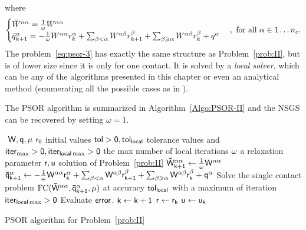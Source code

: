 where
\begin{equation}
  \label{eq:psor-2}
  \begin{cases}
    \Bar W^{\alpha\alpha} = \frac 1 \omega W^{\alpha\alpha} \\
    \bar q^{\alpha}_{k+1} = - \frac 1 \omega W^{\alpha\alpha} r^{\alpha}_{k}
    + \sum_{\beta < \alpha}W^{\alpha\beta} r^{\beta}_{k+1} + \sum_{\beta
      \geq \alpha}W^{\alpha\beta} r^{\beta}_{k} + q^\alpha
  \end{cases}
, \text{ for all } \alpha \in 1\ldots n_c.
\end{equation}
The problem~\eqref{eq:psor-3} has exactly the same structure as Problem~\ref{prob:II}, but is of lower size since it is only for one contact.
It is solved by a \emph{local solver}, which can be any of the algorithms presented in this chapter or even an analytical method (enumerating all the possible cases as in \citep{bonnefon:inria-00553859}).


The PSOR algorithm is summarized in Algorithm~\ref{Algo:PSOR-II} and the NSGS can be recovered by setting $\omega=1$.
%
\begin{algorithm}
  \begin{algorithmic}
    {\sf
      \STATE $ $ 
      \REQUIRE $\sf W,q,\mu$
      \REQUIRE $\sf r_0$ initial values
      \REQUIRE $\sf tol >0, tol_{{local }}$  tolerance values and $\sf iter_{\max}  >0, \sf iter_{local \max}  >0$ the max number of local iterations
      \REQUIRE $\sf \omega$ a relaxation parameter 
      \ENSURE  $\sf r,u$ solution of Problem~\ref{prob:II}
      \STATE $\sf \bar W^{\alpha\alpha}_{k+1} \leftarrow  \frac 1 \omega W^{\alpha\alpha}$
      \STATE $\sf   \bar q^{\alpha}_{k+1} \leftarrow - \frac 1 \omega W^{\alpha\alpha} r^{\alpha}_{k}
      + \sum_{\beta < \alpha}W^{\alpha\beta} r^{\beta}_{k+1} + \sum_{\beta
        \geq \alpha}W^{\alpha\beta} r^{\beta}_{k} + q^\alpha $
      \STATE Solve the single contact problem $\sf \mathrm{FC}(\bar W^{\alpha\alpha},\bar q^{\alpha}_{k+1},\mu)$ at accuracy $\sf tol_{{local }}$ with a maximum of iteration $\sf iter_{local \max}  >0$
      \ENDFOR
      \STATE Evaluate $\sf error$.
      \STATE $\sf k \leftarrow k+1$ 
      \ENDWHILE
      \STATE $\sf r \leftarrow r_{k}$ 
      \STATE $\sf u \leftarrow u_{k}$ 
    }
  \end{algorithmic}
  \caption{PSOR algorithm for Problem~\ref{prob:II}}  \label{Algo:PSOR-II}
\end{algorithm}

